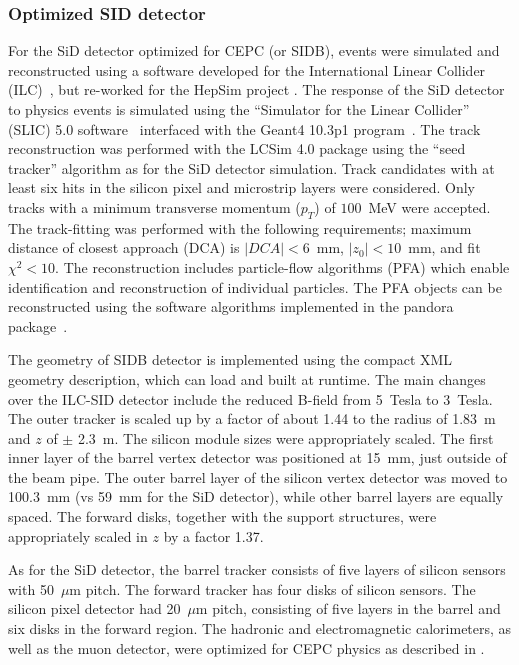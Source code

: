 \subsubsection{Optimized SID detector}
For the SiD detector optimized for CEPC (or SIDB), events were simulated and reconstructed
using a software developed for the International Linear Collider (ILC)~\cite{Adolphsen:2013kya,Behnke:2013lya}, but
re-worked for the HepSim project \cite{Chekanov:2016sme,Chekanov:2016ppq}.
The response of the SiD detector to physics events
is simulated using the ``Simulator for the Linear Collider'' (SLIC) 5.0  software~\cite{Graf:2006ei}
interfaced with the {\sc Geant4} 10.3p1 program~\cite{Allison2016186}.
The track reconstruction  was performed with the {\sc LCSim} 4.0 package  \cite{lcsim} using
the ``seed tracker'' algorithm as for the SiD detector simulation.
Track candidates with at  least six hits in the silicon pixel and microstrip layers were considered.
Only tracks with a minimum transverse momentum ($p_T$) of $100$~MeV were accepted.
The track-fitting was performed with the following requirements; maximum distance of closest approach (DCA) is $|DCA|<6$~mm, $|z_0|<10$~mm,
and fit $\chi^2 < 10$. The reconstruction includes particle-flow algorithms (PFA)
which enable  identification and reconstruction of individual particles.
The PFA objects can be reconstructed using the software algorithms implemented in
the {\sc pandora} package~\cite{Charles:2009ta,Marshall:2013bda}.

The geometry of SIDB detector is implemented using the compact XML geometry description, which can load and built
at runtime. The main changes over the ILC-SID detector include the reduced B-field from
5~Tesla to 3~Tesla. The outer tracker is scaled up by a factor of about 1.44 to the radius of
1.83~m and $z$ of $\pm$ 2.3~m. The  silicon module sizes were appropriately scaled.
The first inner layer of the barrel vertex detector was positioned at 15~mm, just outside of the beam pipe.
The outer barrel layer of the silicon vertex detector was moved to 100.3~mm (vs 59~mm for the SiD detector), while
other barrel layers are equally spaced. The forward disks, together with the support structures,
were appropriately scaled in $z$ by a factor 1.37.

As for the SiD detector, the barrel tracker consists of five layers of  silicon sensors with 50~$\mu$m  pitch.
The forward tracker has four disks of silicon sensors.
The silicon pixel detector had 20~$\mu$m pitch,  consisting of five layers in the barrel and six disks in the
forward region. The hadronic and  electromagnetic calorimeters, as well as the muon detector,
were optimized for CEPC physics as described in \cite{Chekanov:2016efe}.

